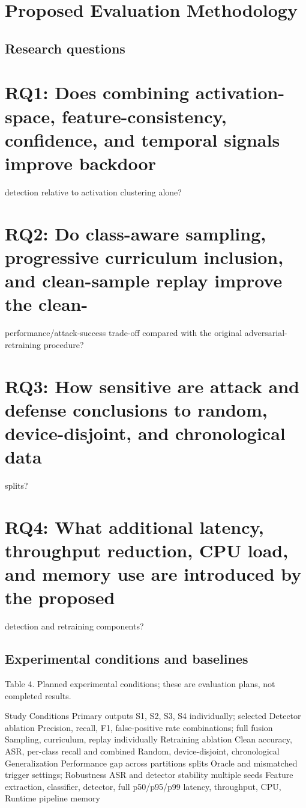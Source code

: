 \documentclass[11pt]{article}
\begin{document}
\section{Proposed Evaluation Methodology}
\subsection{Research questions}
\section{RQ1: Does combining activation-space, feature-consistency, confidence, and temporal signals improve backdoor}
detection relative to activation clustering alone?

\section{RQ2: Do class-aware sampling, progressive curriculum inclusion, and clean-sample replay improve the clean-}
performance/attack-success trade-off compared with the original adversarial-retraining procedure?

\section{RQ3: How sensitive are attack and defense conclusions to random, device-disjoint, and chronological data}
splits?

\section{RQ4: What additional latency, throughput reduction, CPU load, and memory use are introduced by the proposed}
detection and retraining components?

\subsection{Experimental conditions and baselines}
Table 4. Planned experimental conditions; these are evaluation plans, not completed results.

Study                                   Conditions                                       Primary outputs S1, S2, S3, S4 individually; selected Detector ablation                                                                        Precision, recall, F1, false-positive rate combinations; full fusion Sampling, curriculum, replay individually Retraining ablation                                                                      Clean accuracy, ASR, per-class recall and combined Random, device-disjoint, chronological Generalization                                                                           Performance gap across partitions splits Oracle and mismatched trigger settings; Robustness                                                                               ASR and detector stability multiple seeds Feature extraction, classifier, detector, full   p50/p95/p99 latency, throughput, CPU, Runtime pipeline                                         memory
\end{document}
